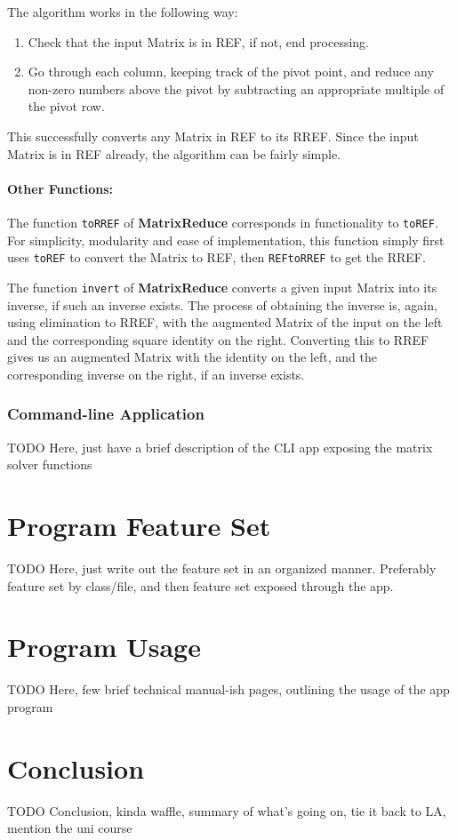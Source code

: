 \documentclass[11pt, a4paper]{article}
\begin{document}
The algorithm works in the following way:

\begin{enumerate}
  \item Check that the input Matrix is in REF, if not, end processing.
  \item Go through each column, keeping track of the pivot point, and reduce any non-zero numbers above the pivot by subtracting an appropriate multiple of the pivot row.
\end{enumerate}

This successfully converts any Matrix in REF to its RREF.
Since the input Matrix is in REF already, the algorithm can be fairly simple.

\paragraph{Other Functions:}

The function \texttt{toRREF} of \textbf{MatrixReduce} corresponds in functionality to \texttt{toREF}.
For simplicity, modularity and ease of implementation, this function simply first uses \texttt{toREF} to convert the Matrix to REF, then \texttt{REFtoRREF} to get the RREF.

The function \texttt{invert} of \textbf{MatrixReduce} converts a given input Matrix into its inverse, if such an inverse exists.
The process of obtaining the inverse is, again, using elimination to RREF, with the augmented Matrix of the input on the left and the corresponding square identity on the right.
Converting this to RREF gives us an augmented Matrix with the identity on the left, and the corresponding inverse on the right, if an inverse exists.


\subsubsection{Command-line Application}

TODO Here, just have a brief description of the CLI app exposing the matrix solver functions


\section{Program Feature Set}

TODO Here, just write out the feature set in an organized manner. Preferably feature set by class/file, and then feature set exposed through the app.



\section{Program Usage}

TODO Here, few brief technical manual-ish pages, outlining the usage of the app program



\section{Conclusion}

TODO Conclusion, kinda waffle, summary of what's going on, tie it back to LA, mention the uni course
\end{document}
